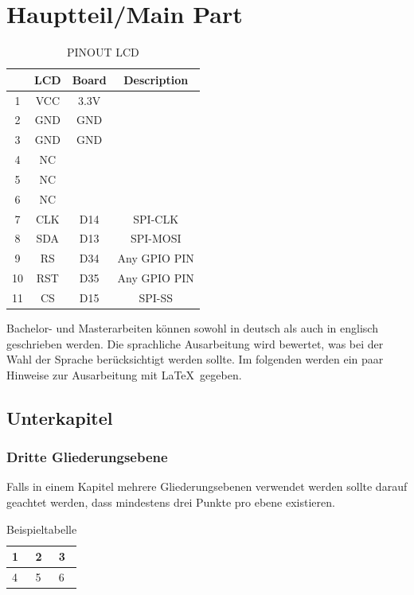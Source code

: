\chapter{Hauptteil/Main Part}

\begin{table}[ht]
	\centering
	\begin{tabular}{|c|c|c|c|}
		\hline
		&LCD&Board&Description\\\hline
		1&VCC&3.3V\\\hline
		2&GND&GND\\\hline
		3&GND&GND\\\hline
		4&NC \\\hline
		5&NC \\\hline
		6&NC \\\hline
		7&CLK&D14&SPI-CLK\\\hline
		8&SDA&D13&SPI-MOSI\\\hline
		9&RS&D34&Any GPIO PIN\\\hline
		10&RST&D35&Any GPIO PIN\\\hline
		11&CS&D15&SPI-SS\\\hline
	\end{tabular}
	\caption{PINOUT LCD}
	\label{Tab:PINOUT_LCD}
\end{table}

Bachelor- und Masterarbeiten können sowohl in deutsch als auch in englisch geschrieben werden. 
Die sprachliche Ausarbeitung wird bewertet, was bei der Wahl der Sprache berücksichtigt werden sollte. 
Im folgenden werden ein paar Hinweise zur Ausarbeitung  mit \LaTeX\ gegeben.


\section{Unterkapitel}
\subsection{Dritte Gliederungsebene}
Falls in einem Kapitel mehrere Gliederungsebenen verwendet werden sollte darauf geachtet werden, dass mindestens drei Punkte pro ebene existieren. 

\begin{table}[h]
	\centering
	\begin{tabular}{|l|l|l|}
		\hline
		1&2&3\\\hline
		4&5&6\\\hline
	\end{tabular}
	\caption{Beispieltabelle}
	\label{Tab:Beispieltabelle}
\end{table}

